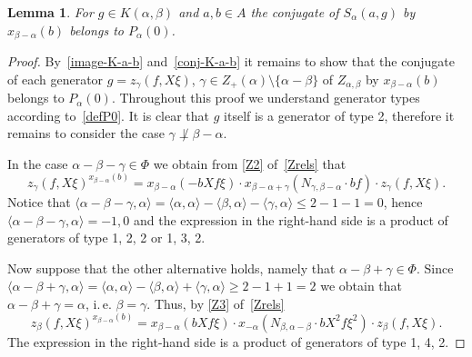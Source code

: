 \documentclass[oneside, 8pt]{amsart}
\newtheorem{lemma}{Lemma}
\theoremstyle{remark}
\theoremstyle{definition}
\numberwithin{lemma}{section}
\numberwithin{prop}{section}
\numberwithin{corollary}{section}
\numberwithin{externaltheorem}{section}
\numberwithin{equation}{section}
\begin{document}
\begin{lemma} For $g \in K(\alpha, \beta)$ and $a, b\in A$ the conjugate of $S_\alpha(a, g)$ by $x_{\beta-\alpha}(b)$ belongs to $P_\alpha(0)$. \end{lemma}
\begin{proof} By~\cref{image-K-a-b} and~\cref{conj-K-a-b} it remains to show that the conjugate of each generator $g = z_\gamma(f, X\xi)$, $\gamma \in Z_+(\alpha) \setminus \{ \alpha - \beta \}$ of $Z_{\alpha, \beta}$ by $x_{\beta-\alpha}(b)$ belongs to $P_\alpha(0)$. Throughout this proof we understand generator types according to~\cref{defP0}. It is clear that $g$ itself is a generator of type 2, therefore it remains to consider the case $\gamma\not \perp \beta - \alpha$. 
 
In the case $\alpha - \beta - \gamma \in \Phi$ we obtain from \eqref{Z2} of~\cref{Zrels} that
\[ z_{\gamma}(f, X\xi) ^ {x_{\beta-\alpha}(b)} = x_{\beta-\alpha} (- bXf\xi) \cdot x_{\beta - \alpha + \gamma} (N_{\gamma, \beta -\alpha}\cdot bf)     \cdot z_{\gamma}(f, X\xi). \] Notice that $\langle \alpha - \beta - \gamma, \alpha \rangle = \langle \alpha, \alpha \rangle - \langle \beta, \alpha \rangle - \langle \gamma, \alpha \rangle \leq 2 - 1 - 1 = 0$, 
 hence $\langle \alpha - \beta - \gamma, \alpha \rangle = -1,0$ and the expression in the right-hand side is a product of generators of type 1, 2, 2 or 1, 3, 2.

Now suppose that the other alternative holds, namely that $\alpha - \beta + \gamma \in \Phi$.
Since $\langle \alpha - \beta + \gamma, \alpha \rangle = \langle \alpha , \alpha \rangle - \langle \beta, \alpha \rangle + \langle \gamma, \alpha \rangle \geq 2 - 1 + 1 = 2$
we obtain that $\alpha - \beta + \gamma = \alpha$, i.\,e. $\beta=\gamma$. Thus, by \eqref{Z3} of~\cref{Zrels}
\[z_{\beta}(f, X\xi) ^ {x_{\beta-\alpha}(b)} = x_{\beta-\alpha} (bXf\xi) \cdot x_{-\alpha} (N_{\beta,\alpha - \beta}\cdot bX^2 f\xi^2) \cdot z_{\beta}(f, X\xi). \]
The expression in the right-hand side is a product of generators of type 1, 4, 2. \end{proof}
\end{document}
